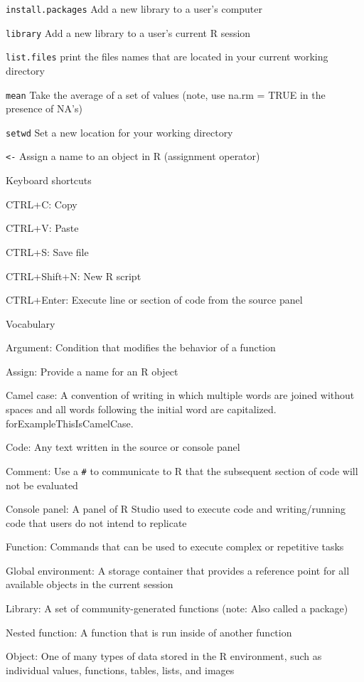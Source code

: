 \documentclass[]{article}
\begin{document}
\texttt{install.packages} Add a new library to a user's computer

\texttt{library} Add a new library to a user's current R session

\texttt{list.files} print the files names that are located in your
current working directory

\texttt{mean} Take the average of a set of values (note, use na.rm =
TRUE in the presence of NA's)

\texttt{setwd} Set a new location for your working directory

\texttt{\textless{}-} Assign a name to an object in R (assignment
operator)

Keyboard shortcuts

CTRL+C: Copy

CTRL+V: Paste

CTRL+S: Save file

CTRL+Shift+N: New R script

CTRL+Enter: Execute line or section of code from the source panel

Vocabulary

Argument: Condition that modifies the behavior of a function

Assign: Provide a name for an R object

Camel case: A convention of writing in which multiple words are joined
without spaces and all words following the initial word are capitalized.
forExampleThisIsCamelCase.

Code: Any text written in the source or console panel

Comment: Use a \texttt{\#} to communicate to R that the subsequent
section of code will not be evaluated

Console panel: A panel of R Studio used to execute code and
writing/running code that users do not intend to replicate

Function: Commands that can be used to execute complex or repetitive
tasks

Global environment: A storage container that provides a reference point
for all available objects in the current session

Library: A set of community-generated functions (note: Also called a
package)

Nested function: A function that is run inside of another function

Object: One of many types of data stored in the R environment, such as
individual values, functions, tables, lists, and images
\end{document}
